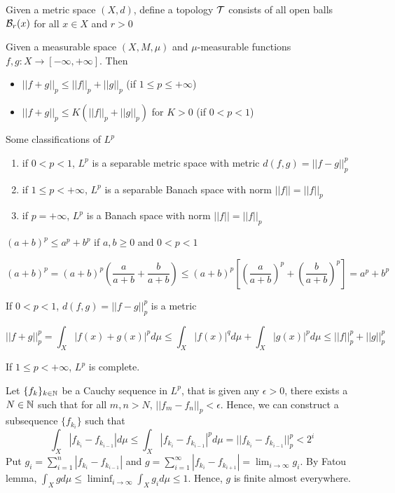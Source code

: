 \documentclass{report}
\begin{document}
\begin{definition}
    Given a metric space $(X, d)$, define a topology $\mathcal{T}$ consists of all open balls $\mathcal{B}_r(x)$ for all $x \in X$ and $r > 0$
\end{definition}

\begin{lemma}
    Given a measurable space $(X, M, \mu)$ and $\mu$-measurable functions $f, g: X \to [-\infty, +\infty]$. Then
    \begin{itemize}
        \item $||f + g||_p \leq ||f||_p + ||g||_p$ (if $1 \leq p \leq +\infty$)
        \item $||f + g||_p \leq K(||f||_p + ||g||_p)$ for $K > 0$ (if $0 < p < 1$)
    \end{itemize}
\end{lemma}

\begin{theorem}[Classification of $L^p$]
    Some classifications of $L^p$
    \begin{enumerate}
        \item if $0 < p < 1$, $L^p$ is a separable metric space with metric $d(f, g) = ||f - g||_p^p$ \label{lp:case1}
        \item if $1 \leq p < +\infty$, $L^p$ is a separable Banach space with norm $||f|| = ||f||_p$ \label{lp:case2}
        \item if $p = +\infty$, $L^p$ is a Banach space with norm $||f|| = ||f||_p$ \label{lp:case3}
    \end{enumerate}
\end{theorem}

\begin{lemma}
    $(a + b)^p \leq a^p + b^p$ if $a, b \geq 0$ and $0 < p < 1$
\end{lemma}

\[
    (a+b)^p = (a+b)^p \left(\frac{a}{a+b} + \frac{b}{a+b} \right) \leq (a+b)^p \left[ \left(\frac{a}{a+b}\right)^p + \left(\frac{b}{a+b}\right)^p \right] = a^p + b^p
\]

\begin{proposition}
    If $0 < p < 1$, $d(f, g) = ||f - g||_p^p$ is a metric 
\end{proposition}

\[
    ||f + g||_p^p = \int_X |f(x) + g(x)|^p d\mu \leq \int_X |f(x)|^q d\mu + \int_X |g(x)|^p d\mu \leq ||f||_p^p + ||g||_p^p
\]

\begin{proposition}
    If $1 \leq p < +\infty$, $L^p$ is complete.
\end{proposition}
Let $\{ f_k \}_{k \in \mathbb{N}}$ be a Cauchy sequence in $L^p$, that is given any $\epsilon > 0$, there exists a $N \in \mathbb{N}$ such that for all $m, n > N$, $||f_m - f_n||_p < \epsilon$. Hence, we can construct a subsequence $\{ f_{k_i} \}$ such that
\[
    \int_X |f_{k_i} - f_{k_{i-1}}| d\mu \leq \int_X |f_{k_i} - f_{k_{i-1}}|^p d\mu = ||f_{k_i} - f_{k_{i-1}}||_p^p < 2^i
\]
Put $g_i = \sum_{i=1}^n |f_{k_i} - f_{k_{i-1}}|$ and $g = \sum_{i=1}^\infty |f_{k_i} - f_{k_{i+1}}| = \lim_{i \to \infty} g_i$. By Fatou lemma, $\int_X g d\mu \leq \liminf_{i \to \infty} \int_X g_i d\mu \leq 1$. Hence, $g$ is finite almost everywhere.
\end{document}
